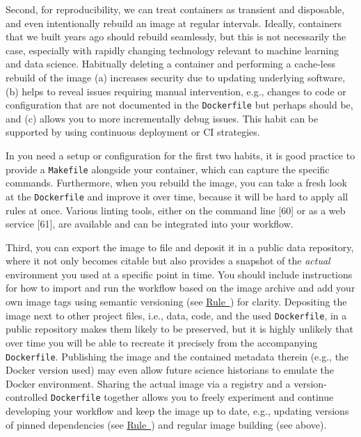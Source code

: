 \documentclass[10pt,letterpaper]{article}
\begin{document}
Second, for reproducibility, we can treat containers as transient and
disposable, and even intentionally rebuild an image at regular
intervals. Ideally, containers that we built years ago should rebuild
seamlessly, but this is not necessarily the case, especially with
rapidly changing technology relevant to machine learning and data
science. Habitually deleting a container and performing a cache-less
rebuild of the image (a) increases security due to updating underlying
software, (b) helps to reveal issues requiring manual intervention,
e.g., changes to code or configuration that are not documented in the
\texttt{Dockerfile} but perhaps should be, and (c) allows you to more
incrementally debug issues. This habit can be supported by using
continuous deployment or CI strategies.

In you need a setup or configuration for the first two habits, it is
good practice to provide a \texttt{Makefile} alongside your container,
which can capture the specific commands. Furthermore, when you rebuild
the image, you can take a fresh look at the \texttt{Dockerfile} and
improve it over time, because it will be hard to apply all rules at
once. Various linting tools, either on the command line {[}60{]} or as a
web service {[}61{]}, are available and can be integrated into your
workflow.

Third, you can export the image to file and deposit it in a public data
repository, where it not only becomes citable but also provides a
snapshot of the \emph{actual} environment you used at a specific point
in time. You should include instructions for how to import and run the
workflow based on the image archive and add your own image tags using
semantic versioning (see
\hyperref[{rule:base}]{Rule~}) for clarity.
Depositing the image next to other project files, i.e., data, code, and
the used \texttt{Dockerfile}, in a public repository makes them likely
to be preserved, but it is highly unlikely that over time you will be
able to recreate it precisely from the accompanying \texttt{Dockerfile}.
Publishing the image and the contained metadata therein (e.g., the
Docker version used) may even allow future science historians to emulate
the Docker environment. Sharing the actual image via a registry and a
version-controlled \texttt{Dockerfile} together allows you to freely
experiment and continue developing your workflow and keep the image up
to date, e.g., updating versions of pinned dependencies (see
\hyperref[{rule:pinning}]{Rule~}) and regular
image building (see above).
\end{document}

